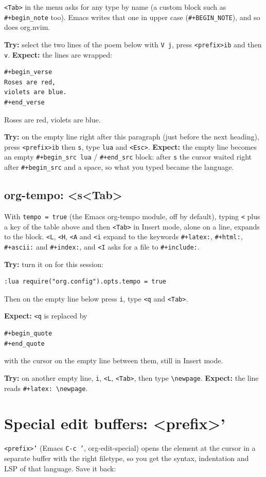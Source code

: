 \texttt{<Tab>} in the menu asks for any type by name (a custom block such as
\texttt{\#+begin\_note} too). Emacs writes that one in upper case
(\texttt{\#+BEGIN\_NOTE}), and so does org.nvim.

\textbf{Try:} select the two lines of the poem below with \texttt{V j}, press
\texttt{<prefix>ib} and then \texttt{v}.
\textbf{Expect:} the lines are wrapped:
\begin{verbatim}
#+begin_verse
Roses are red,
violets are blue.
#+end_verse
\end{verbatim}

Roses are red,
violets are blue.

\textbf{Try:} on the empty line right after this paragraph (just before the
next heading), press \texttt{<prefix>ib} then \texttt{s}, type \texttt{lua} and \texttt{<Esc>}.
\textbf{Expect:} the empty line becomes an empty \texttt{\#+begin\_src lua} /
\texttt{\#+end\_src} block: after \texttt{s} the cursor waited right after
\texttt{\#+begin\_src} and a space, so what you typed became the language.
\subsection{org-tempo: <s<Tab>}
\label{sec:orgd81a00d}
With \texttt{tempo = true} (the Emacs org-tempo module, off by default), typing
\texttt{<} plus a key of the table above and then \texttt{<Tab>} in Insert mode, alone
on a line, expands to the block. \texttt{<L}, \texttt{<H}, \texttt{<A} and \texttt{<i} expand to
the keywords \texttt{\#+latex:}, \texttt{\#+html:}, \texttt{\#+ascii:} and \texttt{\#+index:}, and
\texttt{<I} asks for a file to \texttt{\#+include:}.

\textbf{Try:} turn it on for this session:
\begin{verbatim}
:lua require("org.config").opts.tempo = true
\end{verbatim}
Then on the empty line below press \texttt{i}, type \texttt{<q} and \texttt{<Tab>}.

\textbf{Expect:} \texttt{<q} is replaced by
\begin{verbatim}
#+begin_quote
#+end_quote
\end{verbatim}
with the cursor on the empty line between them, still in Insert mode.

\textbf{Try:} on another empty line, \texttt{i}, \texttt{<L}, \texttt{<Tab>}, then type \texttt{\textbackslash{}newpage}.
\textbf{Expect:} the line reads \texttt{\#+latex: \textbackslash{}newpage}.
\section{Special edit buffers: <prefix>'}
\label{sec:org302e170}
\texttt{<prefix>'} (Emacs \texttt{C-c '}, org-edit-special) opens the element at the
cursor in a separate buffer with the right filetype, so you get the
syntax, indentation and LSP of that language. Save it back:

